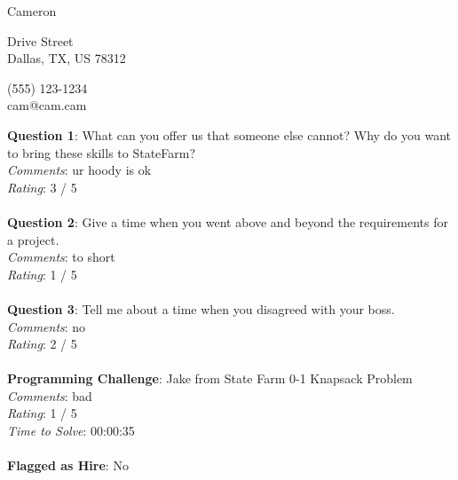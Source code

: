 \documentclass[12pt]{article}
\begin{document}
{\LARGE \begin{center}Cameron\end{center}}

\begin{multicols}{2}
 Drive Street \\
Dallas, TX, US 78312
\columnbreak

\noindent
(555) 123-1234 \\
cam@cam.cam
\end{multicols}

\noindent
\textbf{Question 1}: What can you offer us that someone else cannot? Why do you want to bring these skills to StateFarm?
\\\noindent
\textit{Comments}: ur hoody is ok
\\\noindent
\textit{Rating}: 3 / 5
\\\\
\noindent
\textbf{Question 2}: Give a time when you went above and beyond the requirements for a project.
\\\noindent
\textit{Comments}: to short
\\\noindent
\textit{Rating}: 1 / 5
\\\\
\noindent
\textbf{Question 3}: Tell me about a time when you disagreed with your boss.
\\\noindent
\textit{Comments}: no
\\\noindent
\textit{Rating}: 2 / 5
\\\\
\noindent
\textbf{Programming Challenge}: Jake from State Farm 0-1 Knapsack Problem
\\\noindent
\textit{Comments}: bad
\\\noindent
\textit{Rating}: 1 / 5
\\\noindent
\textit{Time to Solve}: 00:00:35
\\\\
\textbf{Flagged as Hire}: No
\\\\ 
\end{document}
